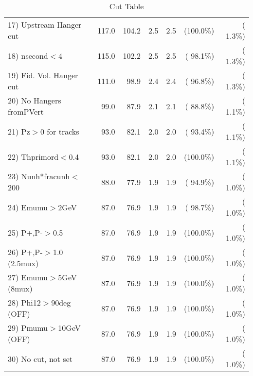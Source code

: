 \begin{table}[h!]
\begin{tabular}{||l||r|r|r|r|r|r||}
 17) Upstream Hanger cut  &        117.0 &        104.2 &          2.5 &          2.5 & (100.0\%) & (  1.3\%) \\
 18) nsecond$<$4          &        115.0 &        102.2 &          2.5 &          2.5 & ( 98.1\%) & (  1.3\%) \\
 19) Fid. Vol. Hanger cut &        111.0 &         98.9 &          2.4 &          2.4 & ( 96.8\%) & (  1.3\%) \\
 20) No Hangers fromPVert &         99.0 &         87.9 &          2.1 &          2.1 & ( 88.8\%) & (  1.1\%) \\
 21) Pz$>$0 for tracks    &         93.0 &         82.1 &          2.0 &          2.0 & ( 93.4\%) & (  1.1\%) \\
 22) Thprimord$<$0.4      &         93.0 &         82.1 &          2.0 &          2.0 & (100.0\%) & (  1.1\%) \\
 23) Nunh*fracunh$<$200   &         88.0 &         77.9 &          1.9 &          1.9 & ( 94.9\%) & (  1.0\%) \\
 24) Emumu$>$2GeV         &         87.0 &         76.9 &          1.9 &          1.9 & ( 98.7\%) & (  1.0\%) \\
 25) P+,P-$>$0.5          &         87.0 &         76.9 &          1.9 &          1.9 & (100.0\%) & (  1.0\%) \\
 26) P+,P-$>$1.0 (2.5mux) &         87.0 &         76.9 &          1.9 &          1.9 & (100.0\%) & (  1.0\%) \\
 27) Emumu$>$5GeV  (8mux) &         87.0 &         76.9 &          1.9 &          1.9 & (100.0\%) & (  1.0\%) \\
 28) Phi12$>$90deg  (OFF) &         87.0 &         76.9 &          1.9 &          1.9 & (100.0\%) & (  1.0\%) \\
 29) Pmumu$>$10GeV  (OFF) &         87.0 &         76.9 &          1.9 &          1.9 & (100.0\%) & (  1.0\%) \\
 30) No cut, not set      &         87.0 &         76.9 &          1.9 &          1.9 & (100.0\%) & (  1.0\%) \\
 \hline
 \hline
 \end{tabular}
 \caption{Cut Table           }
 \label{tab-cutcohjpsi-mumu_cohpip}
 \end{table}
